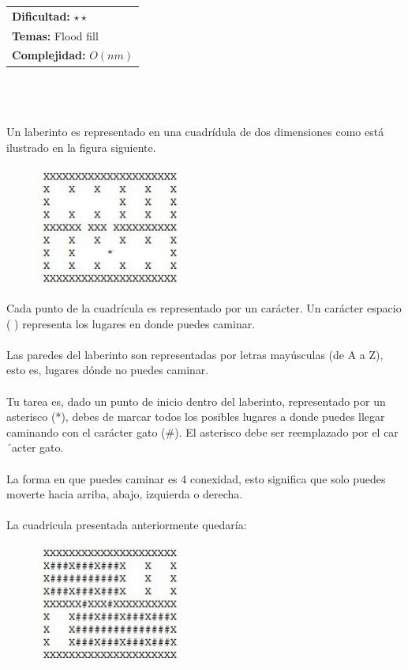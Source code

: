 \documentclass[12pt]{article}
\begin{document}
\hfill
\begin{tabular}{@{}l@{}}
\textbf{Dificultad:} $\star \star$ \\
\textbf{Temas:} Flood fill \\
\textbf{Complejidad:} $O(nm)$
\end{tabular}\\
\\
\\Un laberinto es representado en una cuadrídula de dos dimensiones como está ilustrado en la figura siguiente.
\begin{figure}[h!] 
\begin{center} 
\includegraphics[scale = 1.0]{as.PNG}\hspace{50mm}  
\end{center} 
\end{figure}
Cada punto de la cuadrícula es representado por un carácter. Un carácter espacio ( ) representa los lugares en donde puedes caminar.\\
\\Las paredes del laberinto son representadas por letras mayúsculas (de A a Z), esto es, lugares dónde no puedes caminar.\\
\\Tu tarea es, dado un punto de inicio dentro del laberinto, representado por un asterisco (*), debes de marcar todos los posibles lugares a donde puedes llegar caminando con el carácter gato (\#). El asterisco debe ser reemplazado por el car´acter gato.\\
\\La forma en que puedes caminar es 4 conexidad, esto significa que solo puedes moverte hacia arriba, abajo, izquierda o derecha.\\
\\La cuadricula presentada anteriormente quedaría:
\begin{figure}[h!] 
\begin{center} 
\includegraphics[scale = 1.0]{ad.PNG}\hspace{50mm}  
\end{center} 
\end{figure}
\end{document}
